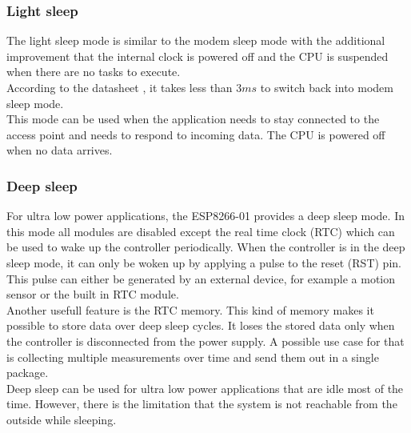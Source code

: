 \subsubsection{Light sleep} \label{sec:light_sleep}
The light sleep mode is similar to the modem sleep mode with the additional improvement that the internal clock is powered off and the CPU is suspended when there are no tasks to execute.\\
According to the datasheet \cite{espressif_inc_esp8266_2016}, it takes less than $3ms$ to switch back into modem sleep mode.\\
This mode can be used when the application needs to stay connected to the access point 
and needs to respond to incoming data. The CPU is powered off when no data arrives.

\subsubsection{Deep sleep} \label{sec:deep_sleep}
For ultra low power applications, the ESP8266-01 provides a deep sleep mode.
In this mode all modules are disabled except the real time clock (RTC) which can be used to wake up the controller periodically.
When the controller is in the deep sleep mode, it can only be woken up by applying a pulse to the reset (RST) pin.
This pulse can either be generated by an external device, for example a motion sensor or the built in RTC module.\\
Another usefull feature is the RTC memory. This kind of memory makes it possible to store data over deep sleep cycles.
It loses the stored data only when the controller is disconnected from the power supply.
A possible use case for that is collecting multiple measurements over time and send them out in a single package.\\
Deep sleep can be used for ultra low power applications that are idle most of the time. 
However, there is the limitation that the system is not reachable from the outside while sleeping. \cite{espressif_inc_esp8266_2016}